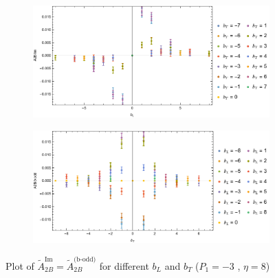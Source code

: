 \documentclass[]{article}
\numberwithin{equation}{section}
\newcommand{\tAmp}{\widetilde{A}}
\newcommand{\tAmp}{\ensuremath{\widetilde{A}^{(+)}}}
\begin{document}
\begin{figure}[h!]
     \centering
     \begin{subfigure}[b]{0.45\textwidth}
         \centering
         \includegraphics[width=\textwidth]{Amp_plots/bL_A2B_b_odd_P1_-3_eta_8.pdf}
     \end{subfigure}
     \begin{subfigure}[b]{0.45\textwidth}
         \centering
         \includegraphics[width=\textwidth]{Amp_plots/bT_A2B_b_odd_P1_-3_eta_8.pdf}
     \end{subfigure}
        \caption{Plot of  $\tAmp^{\text{Im}}_{2B}=\tAmp^{\text{(b-odd)}}_{2B}$ for different $b_{L}$ and $b_{T}$  ($P_{1} = -3$ , $\eta=8$)}
\end{figure}
\end{document}
